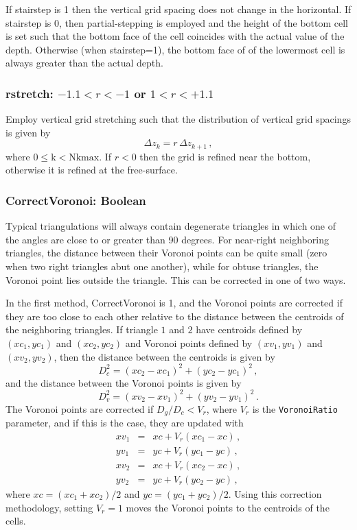 If stairstep is 1 then the vertical grid spacing does not change in
the horizontal. If stairstep is 0, then partial-stepping is employed and
the height of the bottom cell
is set such that the bottom face of the cell coincides with the actual
value of the depth. Otherwise (when stairstep=1), the bottom face of
of the lowermost cell is always greater than the actual depth.  

\subsubsection{rstretch: $-1.1 < r < -1$ or $1 < r < +1.1$}

Employ vertical grid stretching such that the distribution of vertical
grid spacings is given by
\[
\Delta z_k = r\,\Delta z_{k+1}\,,
\]
where $0\le \mbox{k} < \mbox{Nkmax}$.  If $r<0$ then the grid is refined near the
bottom, otherwise it is refined at the free-surface.

\subsubsection{CorrectVoronoi: Boolean}

Typical triangulations will always contain degenerate triangles in which
one of the angles are close to or greater than 90 degrees.  For near-right neighboring
triangles, the distance between their Voronoi points can be quite small (zero when
two right triangles abut one another), while for obtuse triangles,
the Voronoi point lies outside the triangle.  This can be corrected in one of two ways.

In the first method, CorrectVoronoi is 1, and the
Voronoi points are corrected if they are too close to each other
relative to the distance between the centroids of the neighboring triangles.
If triangle $1$ and $2$ have centroids defined by $(xc_1,yc_1)$ and $(xc_2,yc_2)$
and Voronoi points defined by $(xv_1,yv_1)$ and $(xv_2,yv_2)$, then the distance
between the centroids is given by
\[
D_c^2 = (xc_2-xc_1)^2 + (yc_2-yc_1)^2\,,
\]
and the distance between the Voronoi points is given by
\[
D_v^2 = (xv_2-xv_1)^2 + (yv_2-yv_1)^2\,.
\]
The Voronoi points are corrected if $D_g/D_c< V_r$, where $V_r$ is the \verb+VoronoiRatio+ parameter,
and if this is the case, they are updated with
\begin{eqnarray}
xv_1 &=& xc + V_r(xc_1-xc)\,,\nonumber\\
yv_1 &=& yc + V_r(yc_1-yc)\,,\nonumber\\
xv_2 &=& xc + V_r(xc_2-xc)\,,\nonumber\\
yv_2 &=& yc + V_r(yc_2-yc)\,,\nonumber
\end{eqnarray}
where $xc=(xc_1+xc_2)/2$ and $yc=(yc_1+yc_2)/2$.  Using this correction methodology,
setting $V_r=1$ moves the Voronoi points to the centroids of the cells.

